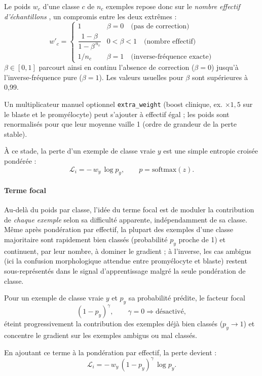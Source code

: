 Le poids $w_c$ d’une classe $c$ de $n_c$ exemples repose donc sur le \emph{nombre effectif d’échantillons} \parencite{cui2019classbalanced}, un compromis entre les deux extrêmes :
\[
  w'_c =
  \begin{cases}
    1 & \beta = 0 \quad \text{(pas de correction)} \\[4pt]
    \dfrac{1-\beta}{1-\beta^{\,n_c}} & 0 < \beta < 1 \quad \text{(nombre effectif)} \\[8pt]
    1/n_c & \beta = 1 \quad \text{(inverse-fréquence exacte)}
  \end{cases}
\]
$\beta \in [0,1]$ parcourt ainsi en continu l’absence de correction ($\beta=0$) jusqu’à l’inverse-fréquence pure ($\beta=1$).
Les valeurs usuelles pour $\beta$ sont supérieures à 0,99.

Un multiplicateur manuel optionnel \texttt{extra\_weight} (boost clinique, ex. $\times 1{,}5$ sur le blaste et le promyélocyte) peut s’ajouter à effectif égal ; les poids sont renormalisés pour que leur moyenne vaille 1 (ordre de grandeur de la perte stable).

À ce stade, la perte d’un exemple de classe vraie $y$ est une simple entropie croisée pondérée :
\[
  \mathcal{L}_i = -\, w_y \, \log p_y, \qquad p = \mathrm{softmax}(z).
\]

\paragraph{Terme focal}
\label{sec:terme-focal}

Au-delà du poids par classe, l’idée du terme focal est de moduler la contribution de \emph{chaque exemple} selon sa difficulté apparente, indépendamment de sa classe.
Même après pondération par effectif, la plupart des exemples d’une classe majoritaire sont rapidement bien classés (probabilité $p_y$ proche de 1) et continuent, par leur nombre, à dominer le gradient ; à l’inverse, les cas ambigus (ici la confusion morphologique attendue entre promyélocyte et blaste) restent sous-représentés dans le signal d’apprentissage malgré la seule pondération de classe.

Pour un exemple de classe vraie $y$ et $p_y$ sa probabilité prédite, le facteur focal \parencite{lin2017focal}
\[
  (1 - p_y)^{\gamma}, \qquad \gamma = 0 \Rightarrow \text{désactivé},
\]
éteint progressivement la contribution des exemples déjà bien classés ($p_y \to 1$) et concentre le gradient sur les exemples ambigus ou mal classés.

En ajoutant ce terme à la pondération par effectif, la perte devient :
\[
  \mathcal{L}_i = -\, w_y \,(1 - p_y)^{\gamma} \, \log p_y .
\]

